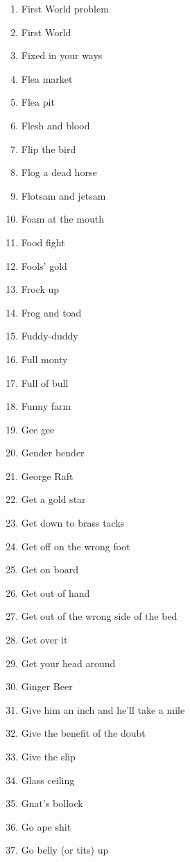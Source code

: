 \begin{enumerate}
        \item  First World problem
        \item  First World
        \item  Fixed in your ways
        \item  Flea market
        \item  Flea pit
        \item  Flesh and blood
        \item  Flip the bird
        \item  Flog a dead horse
        \item  Flotsam and jetsam
        \item  Foam at the mouth
        \item  Food fight
        \item  Fools' gold
        \item  Frock up
        \item  Frog and toad
        \item  Fuddy-duddy
        \item  Full monty
        \item  Full of bull
        \item  Funny farm
        \item  Gee gee
        \item  Gender bender
        \item  George Raft
        \item  Get a gold star
        \item  Get down to brass tacks
        \item  Get off on the wrong foot
        \item  Get on board
        \item  Get out of hand
        \item  Get out of the wrong side of the bed
        \item  Get over it
        \item  Get your head around
        \item  Ginger Beer
        \item  Give him an inch and he'll take a mile
        \item  Give the benefit of the doubt
        \item  Give the slip
        \item  Glass ceiling
        \item  Gnat's bollock
        \item  Go ape shit
        \item  Go belly (or tits) up

\end{enumerate}
